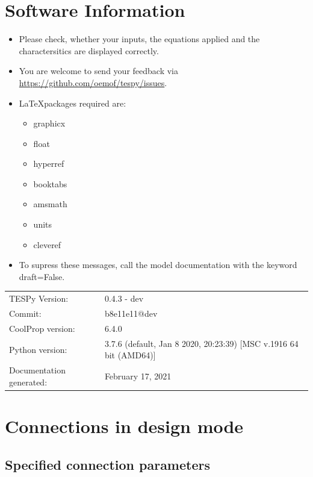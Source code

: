 \section*{Software Information}

\begin{itemize}
\item Please check, whether your inputs, the equations applied and the charactersitics are displayed correctly.
\item You are welcome to send your feedback via \url{https://github.com/oemof/tespy/issues}.
\item \LaTeX packages required are:
\begin{itemize}
\item graphicx
\item float
\item hyperref
\item booktabs
\item amsmath
\item units
\item cleveref
\end{itemize}
\item To supress these messages, call the model documentation with the keyword draft=False.
\end{itemize}

\begin{table}[H]
\begin{tabular}{ll}
TESPy Version:&0.4.3 - dev\\
Commit:&b8e11e11@dev\\
CoolProp version:&6.4.0\\
Python version:&3.7.6 (default, Jan  8 2020, 20:23:39) [MSC v.1916 64 bit (AMD64)]\\
Documentation generated:&February 17, 2021\\
\end{tabular}
\end{table}
\newpage\section{Connections in design mode}

\subsection{Specified connection parameters}

